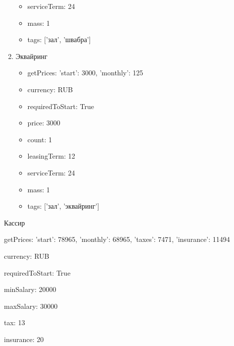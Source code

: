 \documentclass[a4paper,12pt]{article}
\begin{document}
\begin{enumerate}
\begin{itemize}
          \item serviceTerm: 24
        
          \item mass: 1
        
          \item tags: ['зал', 'швабра']
        
        \end{itemize}
      
      \item Эквайринг
        \begin{itemize}
        
          \item getPrices: {'start': 3000, 'monthly': 125}
        
          \item currency: RUB
        
          \item requiredToStart: True
        
          \item price: 3000
        
          \item count: 1
        
          \item leasingTerm: 12
        
          \item serviceTerm: 24
        
          \item mass: 1
        
          \item tags: ['зал', 'эквайринг']
        
        \end{itemize}
      
    \end{enumerate}
    
    
      
      Кассир
        
        getPrices: {'start': 78965, 'monthly': 68965, 'taxes': 7471, 'insurance': 11494}

        
        currency: RUB

        
        requiredToStart: True

        
        minSalary: 20000

        
        maxSalary: 30000

        
        tax: 13

        
        insurance: 20
\end{document}
